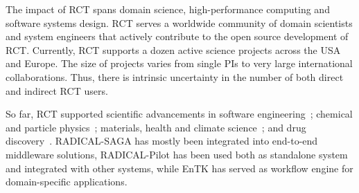 \documentclass[preprint,12pt, a4paper]{elsarticle}
\begin{document}


The impact of RCT spans domain science, high-performance computing and
software systems design. RCT serves a worldwide community of domain
scientists and system engineers that actively contribute to the open source
development of RCT. Currently, RCT supports a dozen active science projects
across the USA and Europe. The size of projects varies from single PIs to
very large international collaborations. Thus, there is intrinsic uncertainty
in the number of both direct and indirect RCT users.

So far, RCT supported scientific advancements in software
engineering~\cite{se}; chemical and particle physics~\cite{cpp}; materials,
health and climate science~\cite{mhcs}; and drug discovery~\cite{dd}.
RADICAL-SAGA has mostly been integrated into end-to-end middleware solutions,
RADICAL-Pilot has been used both as standalone system and integrated with
other systems, while EnTK has served as workflow engine for domain-specific
applications.
\end{document}
